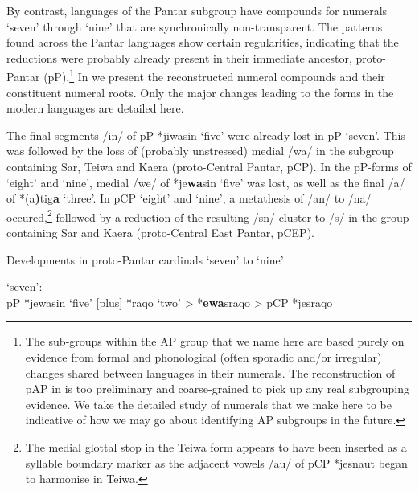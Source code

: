 \let\eachwordone=\it
\let\eachwordtwo=\rm
\let\eachwordthree=\rm
\let\eachwordfour=\rm
\let\eachwordfive=\rm
\let\eachwordsix=\rm
\let\eachwordseven=\rm

By contrast, languages of the Pantar subgroup have compounds for numerals `seven' through `nine' that are synchronically non-transparent. The patterns found across the Pantar languages show certain regularities, indicating that the reductions were probably already present in their immediate ancestor, proto-Pantar (pP).\footnote{{}   The sub-groups within the AP group that we name here are based purely on evidence from formal and phonological (often sporadic and/or irregular) changes shared between languages in their numerals. The reconstruction of pAP in \citet{HoltonEtAl2012} is too preliminary and coarse-grained to pick up any real subgrouping evidence. We take the detailed study of numerals that we make here to be indicative of how we may go about identifying AP subgroups in the future.}  In  we present the reconstructed numeral compounds and their constituent numeral roots. Only the major changes leading to the forms in the modern languages are detailed here. 

  The final segments /in/ of pP *jiwasin `five' were already lost in pP `seven'. This was followed by the loss of (probably unstressed) medial /wa/ in the subgroup containing Sar, Teiwa and Kaera (proto-Central Pantar, pCP). In the pP-forms of `eight' and `nine', medial /we/ of *je\textbf{wa}sin `five' was lost, as well as the final /a/ of *(a\textbf{)}tig\textbf{a} `three'. In pCP `eight' and `nine', a metathesis of /an/ to /na/ occured,\footnote{{}   The medial glottal stop in the Teiwa form appears to have been inserted as a syllable boundary marker as the adjacent vowels /au/ of pCP *jesnaut began to harmonise in Teiwa.}  followed by a reduction of the resulting /sn/ cluster to /s/ in the group containing Sar and Kaera (proto-Central East Pantar, pCEP). 

  Developments in proto-Pantar cardinals `seven' to `nine' 

\ea%
\label{ex:6:7}
\ea
  `seven':\\
  pP *jewasin `five' [plus] *raqo `two' {\textgreater} *\textbf{{\textsecstress}ewa}s{\textprimstress}raqo     {\textgreater}  pCP *jesraqo 

